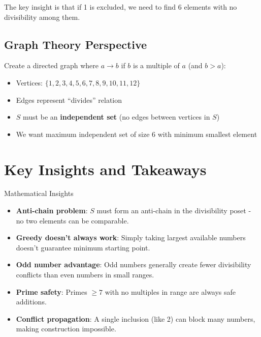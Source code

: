 \documentclass[12pt]{article}
\begin{document}
The key insight is that if 1 is excluded, we need to find 6 elements with no divisibility among them.

\subsection*{Graph Theory Perspective}

Create a directed graph where $a \to b$ if $b$ is a multiple of $a$ (and $b > a$):

\begin{itemize}
    \item Vertices: $\{1,2,3,4,5,6,7,8,9,10,11,12\}$
    \item Edges represent ``divides'' relation
    \item $S$ must be an \textbf{independent set} (no edges between vertices in $S$)
    \item We want maximum independent set of size 6 with minimum smallest element
\end{itemize}

\section*{Key Insights and Takeaways}

\begin{highlightbox}{Mathematical Insights}
\begin{itemize}
    \item \textbf{Anti-chain problem}: $S$ must form an anti-chain in the divisibility poset - no two elements can be comparable.
    
    \item \textbf{Greedy doesn't always work}: Simply taking largest available numbers doesn't guarantee minimum starting point.
    
    \item \textbf{Odd number advantage}: Odd numbers generally create fewer divisibility conflicts than even numbers in small ranges.
    
    \item \textbf{Prime safety}: Primes $\geq 7$ with no multiples in range are always safe additions.
    
    \item \textbf{Conflict propagation}: A single inclusion (like 2) can block many numbers, making construction impossible.
\end{itemize}
\end{highlightbox}
\end{document}
